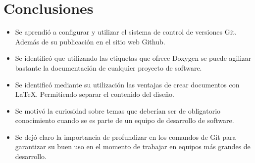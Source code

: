 \documentclass{article}
\begin{document}
  \section{Conclusiones}
  \begin{itemize}
  \item Se aprendió a configurar y utilizar el sistema de control de versiones Git. Además de su publicación en el sitio web Github.
  \item Se identificó que utilizando las etiquetas que ofrece Doxygen se puede agilizar bastante la documentación de cualquier proyecto de software.
  \item Se identificó mediante su utilización las ventajas de crear documentos con LaTeX. Permitiendo separar el contenido del diseño.
  \item Se motivó la curiosidad sobre temas que deberían ser de obligatorio conocimiento cuando se es parte de un equipo de desarrollo de software.
  \item Se dejó claro la importancia de profundizar en los comandos de Git para garantizar su buen uso en el momento de trabajar en equipos más grandes de desarrollo.
  \end{itemize}
\end{document}
